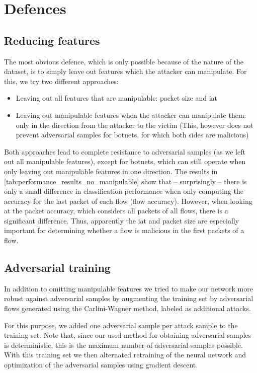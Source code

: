\documentclass[conference]{IEEEtran}
\begin{document}
\section{Defences}

\subsection{Reducing features}
The most obvious defence, which is only possible because of the nature of the dataset, is to simply leave out features which the attacker can manipulate. For this, we try two different approaches:
\begin{itemize}[topsep=0pt,wide,labelwidth=!,labelindent=0pt]
\item Leaving out all features that are manipulable: packet size and \gls{iat}
\item Leaving out manipulable features when the attacker can manipulate them: only in the direction from the attacker to the victim (This, however does not prevent adversarial samples for botnets, for which both sides are malicious)
\end{itemize}

Both approaches lead to complete resistance to adversarial samples (as we left out all manipulable features), except for botnets, which can still operate when only leaving out manipulable features in one direction. The results in \autoref{tab:performance_results_no_manipulable} show that -- surprisingly -- there is only a small difference in classification performance when only computing the accuracy for the last packet of each flow (flow accuracy). However, when looking at the packet accuracy, which considers all packets of all flows, there is a significant difference. Thus, apparently the \gls{iat} and packet size are especially important for determining whether a flow is malicious in the first packets of a flow.

\subsection{Adversarial training}
In addition to omitting manipulable features we tried to make our network more robust against adversarial samples by augmenting the training set by adversarial flows generated using the Carlini-Wagner method, labeled as additional attacks.

For this purpose, we added one adversarial sample per attack sample to the training set. Note that, since our used method for obtaining adversarial samples is deterministic, this is the maximum number of adversarial samples possible. With this training set we then alternated retraining of the neural network and optimization of the adversarial samples using gradient descent.
\end{document}
